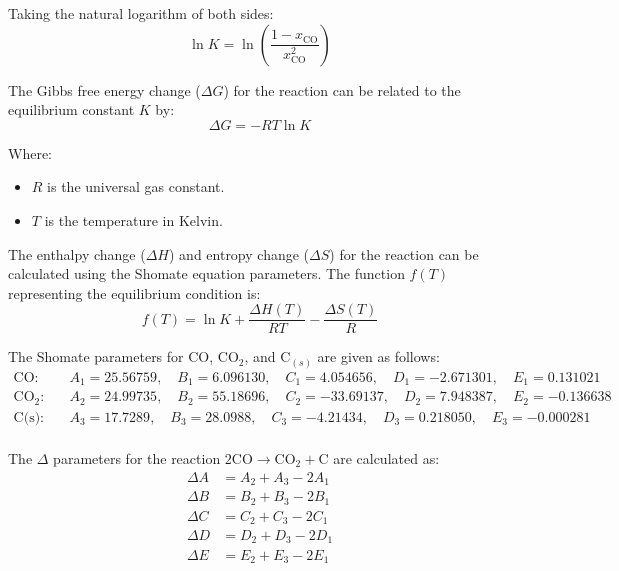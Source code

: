 \documentclass[10pt]{article}
\begin{document}
Taking the natural logarithm of both sides:
\begin{equation}
\ln K = \ln \left( \frac{1 - x_{\text{CO}}}{x_{\text{CO}}^2} \right)
\end{equation}

The Gibbs free energy change (\( \Delta G \)) for the reaction can be related to the equilibrium constant \( K \) by:
\begin{equation}
\Delta G = -RT \ln K
\end{equation}

Where:
\begin{itemize}
    \item \( R \) is the universal gas constant.
    \item \( T \) is the temperature in Kelvin.
\end{itemize}

The enthalpy change (\( \Delta H \)) and entropy change (\( \Delta S \)) for the reaction can be calculated using the Shomate equation parameters. The function \( f(T) \) representing the equilibrium condition is:
\begin{equation}
f(T) = \ln K + \frac{\Delta H(T)}{RT} - \frac{\Delta S(T)}{R}
\end{equation}

The Shomate parameters for \(\text{CO}\), \(\text{CO}_2\), and \(\text{C}_(s)\) are given as follows:
\begin{equation}
\begin{aligned}
\text{CO:} & \quad A_1 = 25.56759, \quad B_1 = 6.096130, \quad C_1 = 4.054656, \quad D_1 = -2.671301, \quad E_1 = 0.131021 \\
\text{\(\text{CO}_2\):} & \quad A_2 = 24.99735, \quad B_2 = 55.18696, \quad C_2 = -33.69137, \quad D_2 = 7.948387, \quad E_2 = -0.136638 \\
\text{C(s):} & \quad A_3 = 17.7289, \quad B_3 = 28.0988, \quad C_3 = -4.21434, \quad D_3 = 0.218050, \quad E_3 = -0.000281 \\
\end{aligned}
\end{equation}

The \(\Delta\) parameters for the reaction \( 2\text{CO} \rightarrow \text{CO}_2 + \text{C} \) are calculated as:
\begin{equation}
\begin{aligned}
\Delta A &= A_2 + A_3 - 2A_1 \\
\Delta B &= B_2 + B_3 - 2B_1 \\
\Delta C &= C_2 + C_3 - 2C_1 \\
\Delta D &= D_2 + D_3 - 2D_1 \\
\Delta E &= E_2 + E_3 - 2E_1 \\
\end{aligned}
\end{equation}
\end{document}
